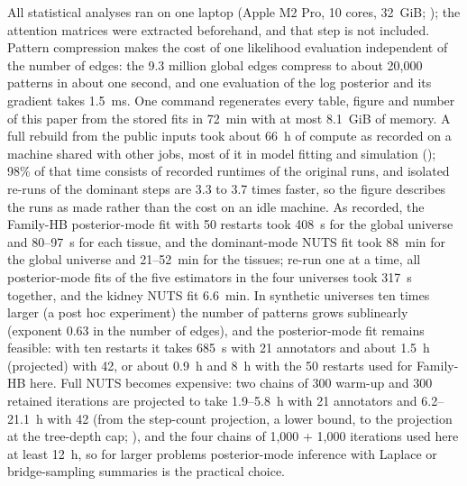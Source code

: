 \documentclass[11pt,a4paper]{article}
\begin{document}
All statistical analyses ran on one laptop (Apple M2 Pro, 10 cores, 32~GiB; ); the attention matrices were extracted beforehand, and that step is not included.
Pattern compression makes the cost of one likelihood evaluation independent of the number of edges: the 9.3 million global edges compress to about 20{,}000 patterns in about one second, and one evaluation of the log posterior and its gradient takes 1.5~ms.
One command regenerates every table, figure and number of this paper from the stored fits in 72~min with at most 8.1~GiB of memory.
A full rebuild from the public inputs took about 66~h of compute as recorded on a machine shared with other jobs, most of it in model fitting and simulation (); 98\% of that time consists of recorded runtimes of the original runs, and isolated re-runs of the dominant steps are 3.3 to 3.7 times faster, so the figure describes the runs as made rather than the cost on an idle machine.
As recorded, the Family-HB posterior-mode fit with 50 restarts took 408~s for the global universe and 80--97~s for each tissue, and the dominant-mode NUTS fit took 88~min for the global universe and 21--52~min for the tissues; re-run one at a time, all posterior-mode fits of the five estimators in the four universes took 317~s together, and the kidney NUTS fit 6.6~min.
In synthetic universes ten times larger (a post hoc experiment) the number of patterns grows sublinearly (exponent 0.63 in the number of edges), and the posterior-mode fit remains feasible: with ten restarts it takes 685~s with 21 annotators and about 1.5~h (projected) with 42, or about 0.9~h and 8~h with the 50 restarts used for Family-HB here.
Full NUTS becomes expensive: two chains of 300 warm-up and 300 retained iterations are projected to take 1.9--5.8~h with 21 annotators and 6.2--21.1~h with 42 (from the step-count projection, a lower bound, to the projection at the tree-depth cap; ), and the four chains of 1{,}000 + 1{,}000 iterations used here at least 12~h, so for larger problems posterior-mode inference with Laplace or bridge-sampling summaries is the practical choice.
\end{document}
